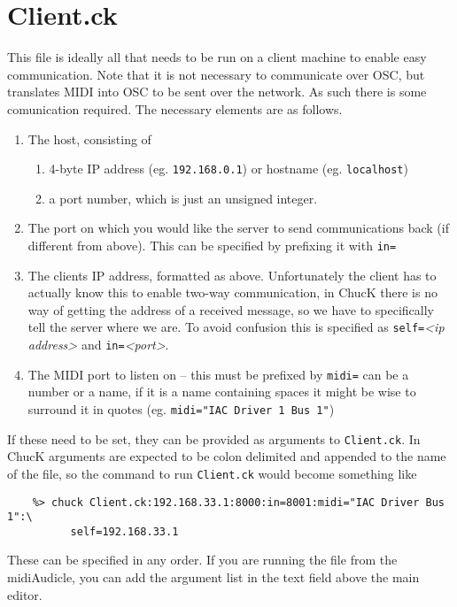 \documentclass{article}
\begin{document}
\section{Client.ck}
This file is ideally all that needs to be run on a client machine to enable easy communication. Note that it is not necessary to communicate over OSC,
but translates MIDI into OSC to be sent over the network. As such there is some comunication required. The necessary elements are as follows.

\begin{enumerate} [\bf a)]
	\item The host, consisting of
	\begin{enumerate} [\bf i)]
		\item 4-byte IP address (eg. \texttt{192.168.0.1}) or hostname (eg. \texttt{localhost})
		\item a port number, which is just an unsigned integer.
	\end{enumerate}
	\item The port on which you would like the server to send communications back (if different from above). This can be specified by prefixing it with
		\texttt{in=}
	\item The clients IP address, formatted as above. Unfortunately the client has to actually know this to enable two-way communication, 
		in ChucK there is no way of getting the address of a received message, so we have to specifically tell the server where we are.
		To avoid confusion this is specified as \texttt{self=}\textit{<ip address>} and \texttt{in=}\textit{<port>}.
	\item The MIDI port to listen on -- this must be prefixed by \texttt{midi=} can be a number or a name, if it is a name containing spaces it might be
		 wise to surround it in quotes (eg. \texttt{midi="IAC Driver 1 Bus 1"})
		
\end{enumerate}
If these need to be set, they can be provided as arguments to \texttt{Client.ck}. In ChucK arguments are expected to be colon delimited and appended
to the name of the file, so the command to run \texttt{Client.ck} would become something like 
\begin{verbatim}
    %> chuck Client.ck:192.168.33.1:8000:in=8001:midi="IAC Driver Bus 1":\
    	  self=192.168.33.1
\end{verbatim}
These can be specified in any order.
If you are running the file from the midiAudicle, you can add the argument list in the text field above the main editor.
\end{document}
